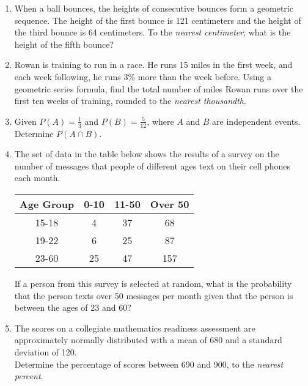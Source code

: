 \documentclass[12pt, twoside]{article}
\begin{document}
\begin{enumerate}[itemsep=0.5cm]
\item When a ball bounces, the heights of consecutive bounces form a geometric sequence. The height of the first bounce is 121 centimeters and the height of the third bounce is 64 centimeters. To the \emph{nearest centimeter}, what is the height of the fifth bounce? %

\item Rowan is training to run in a race. He runs 15 miles in the first week, and each week following, he runs 3\% more than the week before. Using a geometric series formula, find the total number of miles Rowan runs over the first ten weeks of training, rounded to the \emph{nearest thousandth}. %

\newpage
\item Given $P(A) = \frac{1}{3}$ and $P(B) = \frac{5}{12}$, where $A$ and $B$ are independent events. Determine $P(A \cap B)$. \vspace{3cm}

\item The set of data in the table below shows the results of a survey on the number of messages that people of different ages text on their cell phones each month.
\begin{center}
    \begin{tabular}{|c|c|c|c|}
        \hline
        Age Group & 0-10 & 11-50 & Over 50 \\
        \hline
        15-18 & 4 & 37 & 68 \\[0.25cm]
        \hline
        19-22 & 6 & 25 & 87 \\[0.25cm]
        \hline
        23-60 & 25 & 47 & 157 \\[0.25cm]
        \hline
    \end{tabular}
\end{center}
If a person from this survey is selected at random, what is the probability that the person texts over 50 messages per month given that the person is between the ages of 23 and 60?  \vspace{3cm}

\item The scores on a collegiate mathematics readiness assessment are approximately normally distributed with a mean of 680 and a standard deviation of 120.\\[0.5cm]
Determine the percentage of scores between 690 and 900, to the \emph{nearest percent}.\vspace{3cm}




\end{enumerate}
\end{document}
